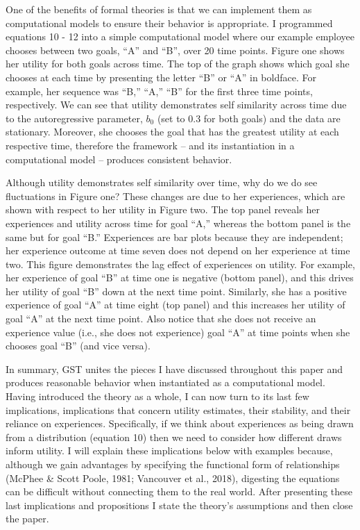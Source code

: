 \documentclass[english,,man]{apa6}
\theoremstyle{definition}
\theoremstyle{definition}
\theoremstyle{definition}
\theoremstyle{remark}
\begin{document}
One of the benefits of formal theories is that we can implement them as
computational models to ensure their behavior is appropriate. I
programmed equations 10 - 12 into a simple computational model where our
example employee chooses between two goals, \enquote{A} and \enquote{B},
over 20 time points. Figure one shows her utility for both goals across
time. The top of the graph shows which goal she chooses at each time by
presenting the letter \enquote{B} or \enquote{A} in boldface. For
example, her sequence was \enquote{B,} \enquote{A,} \enquote{B} for the
first three time points, respectively. We can see that utility
demonstrates self similarity across time due to the autoregressive
parameter, \(b_0\) (set to 0.3 for both goals) and the data are
stationary. Moreover, she chooses the goal that has the greatest utility
at each respective time, therefore the framework -- and its
instantiation in a computational model -- produces consistent behavior.

Although utility demonstrates self similarity over time, why do we do
see fluctuations in Figure one? These changes are due to her
experiences, which are shown with respect to her utility in Figure two.
The top panel reveals her experiences and utility across time for goal
\enquote{A,} whereas the bottom panel is the same but for goal
\enquote{B.} Experiences are bar plots because they are independent; her
experience outcome at time seven does not depend on her experience at
time two. This figure demonstrates the lag effect of experiences on
utility. For example, her experience of goal \enquote{B} at time one is
negative (bottom panel), and this drives her utility of goal \enquote{B}
down at the next time point. Similarly, she has a positive experience of
goal \enquote{A} at time eight (top panel) and this increases her
utility of goal \enquote{A} at the next time point. Also notice that she
does not receive an experience value (i.e., she does not experience)
goal \enquote{A} at time points when she chooses goal \enquote{B} (and
vice versa).

In summary, GST unites the pieces I have discussed throughout this paper
and produces reasonable behavior when instantiated as a computational
model. Having introduced the theory as a whole, I can now turn to its
last few implications, implications that concern utility estimates,
their stability, and their reliance on experiences. Specifically, if we
think about experiences as being drawn from a distribution (equation 10)
then we need to consider how different draws inform utility. I will
explain these implications below with examples because, although we gain
advantages by specifying the functional form of relationships (McPhee \&
Scott Poole, 1981; Vancouver et al., 2018), digesting the equations can
be difficult without connecting them to the real world. After presenting
these last implications and propositions I state the theory's
assumptions and then close the paper.
\end{document}
